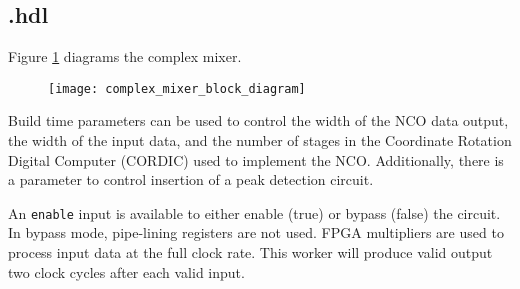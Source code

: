 \subsection*{\comp.hdl}
\begin{flushleft}
	Figure \ref{fig:complex_mixer} diagrams the complex mixer.\medskip

	\begin{figure}[h]
		\centering\captionsetup{type=figure}\texttt{[image: complex\_mixer\_block\_diagram]}
		\label{fig:complex_mixer}
	\end{figure}
	Build time parameters can be used to control the width of the NCO data output, the width of the input data, and the number of stages in the Coordinate Rotation Digital Computer (CORDIC) used to implement the NCO. Additionally, there is a parameter to control insertion of a peak detection circuit.\medskip

	An \verb+enable+ input is available to either enable (true) or bypass (false) the circuit. In bypass mode, pipe-lining registers are not used. FPGA multipliers are used to process input data at the full clock rate. This worker will produce valid output two clock cycles after each valid input.
\end{flushleft}
